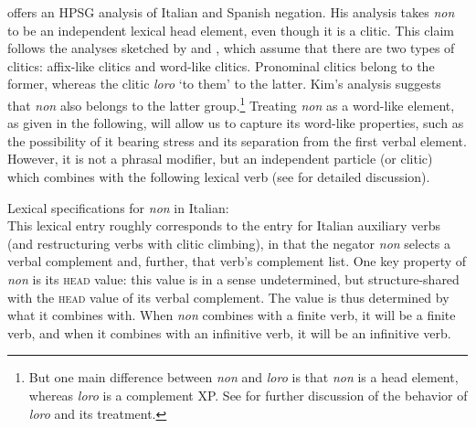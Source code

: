 \documentclass[output=paper
	        ,collection
	        ,collectionchapter
 	        ,biblatex
                ,babelshorthands
                ,newtxmath
                ,draftmode
                ,colorlinks, citecolor=brown
]{langscibook}
\begin{document}
{\begin{exe}
\begin{xlist}
\citet{Kim:00} offers an HPSG analysis of Italian and Spanish negation.
His analysis takes \textit{non}
to be an independent lexical head element, even though it is a clitic.
This claim follows the  analyses sketched by \citet{Monachesi:93} and \citet{Monachesi:98},
which assume that there are two types of clitics: affix-like
clitics and word-like clitics. Pronominal clitics belong to the
former, whereas the clitic \textit{loro} `to them' to the
latter. Kim's analysis suggests that \textit{non} also belongs
to the latter group.\footnote{But one main difference between
\textit{non} and \textit{loro} is that \textit{non} is a head
element, whereas \textit{loro} is a complement XP. See
\citet{Monachesi:98} for further discussion of the
behavior of \textit{loro} and its treatment.} 
Treating \textit{non} as
a word-like element, as given in the following, will allow us to capture its word-like
properties, such as the possibility of it bearing stress and
its separation from the first verbal element. However, it is not a
phrasal modifier, but an independent particle (or clitic) which combines with
the following lexical  verb (see \citealt{Kim:00} for
detailed discussion).

\ea
\label{negation-non}
Lexical specifications for \textit{non} in Italian:\\
\z
%
\noindent
This lexical entry roughly corresponds to the entry for
Italian auxiliary verbs (and restructuring verbs with clitic climbing),
in that the negator \textit{non} selects a verbal complement and, further, that verb's
complement list. One key property of \textit{non}
is its \textsc{head} value: this value is in a sense undetermined, but structure-shared with the \textsc{head} value of its verbal complement.
The value is thus
determined by what it combines with. When \textit{non} combines with a finite
verb, it will be a finite verb, and when it combines with an
infinitive verb, it will be an infinitive verb.


\end{xlist}
\end{exe}}
\end{document}

